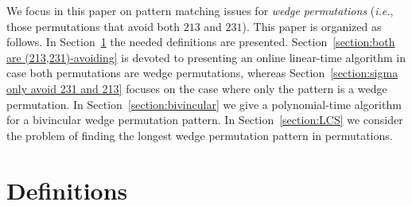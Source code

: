 \documentclass[a4paper]{llncs}
\newcounter{num}
\begin{document}
We focus in this paper on pattern matching issues for \emph{wedge permutations}
(\emph{i.e.}, those permutations that avoid both $213$ and $231$).
This paper is organized as follows.
In Section~\ref{section:Definitions} the needed definitions are presented.
Section~\ref{section:both are (213,231)-avoiding} is devoted to presenting
an online linear-time algorithm in case both
permutations are wedge permutations,
whereas Section~\ref{section:sigma only avoid 231 and 213} focuses on the case
where only the pattern is a wedge permutation.
In Section~\ref{section:bivincular} we give a polynomial-time algorithm
for a bivincular wedge permutation pattern.
In Section~\ref{section:LCS} we consider the problem of finding the longest
wedge permutation pattern in permutations.



\section{Definitions}
\label{section:Definitions}
\end{document}
